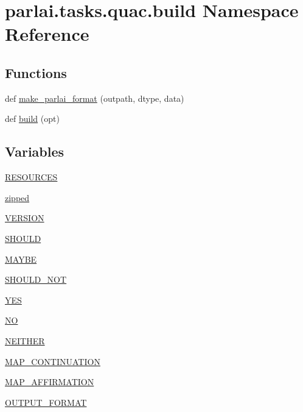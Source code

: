 \hypertarget{namespaceparlai_1_1tasks_1_1quac_1_1build}{}\section{parlai.\+tasks.\+quac.\+build Namespace Reference}
\label{namespaceparlai_1_1tasks_1_1quac_1_1build}
\subsection*{Functions}
\begin{DoxyCompactItemize}
\item 
def \hyperlink{namespaceparlai_1_1tasks_1_1quac_1_1build_a08c212462b5c58cde91192d35f24f0cc}{make\+\_\+parlai\+\_\+format} (outpath, dtype, data)
\item 
def \hyperlink{namespaceparlai_1_1tasks_1_1quac_1_1build_a86e9b7d4a167a4dc22e925770ce42824}{build} (opt)
\end{DoxyCompactItemize}
\subsection*{Variables}
\begin{DoxyCompactItemize}
\item 
\hyperlink{namespaceparlai_1_1tasks_1_1quac_1_1build_aa032453fdec498146aade28be1af2c6e}{R\+E\+S\+O\+U\+R\+C\+ES}
\item 
\hyperlink{namespaceparlai_1_1tasks_1_1quac_1_1build_a340e24695bb031dddd67c1782624c1ab}{zipped}
\item 
\hyperlink{namespaceparlai_1_1tasks_1_1quac_1_1build_aee2d9534e5051b42e514f35e83aa6750}{V\+E\+R\+S\+I\+ON}
\item 
\hyperlink{namespaceparlai_1_1tasks_1_1quac_1_1build_a4aacd61cba5c1f53ff8fcf6e13d83ec7}{S\+H\+O\+U\+LD}
\item 
\hyperlink{namespaceparlai_1_1tasks_1_1quac_1_1build_a65376ab86ca845a24c1c3aca39ffdf24}{M\+A\+Y\+BE}
\item 
\hyperlink{namespaceparlai_1_1tasks_1_1quac_1_1build_a0ebac26df68c69fd9163e1a61fa630ec}{S\+H\+O\+U\+L\+D\+\_\+\+N\+OT}
\item 
\hyperlink{namespaceparlai_1_1tasks_1_1quac_1_1build_a8187aab9baf4a32e341c7aac0f76ce14}{Y\+ES}
\item 
\hyperlink{namespaceparlai_1_1tasks_1_1quac_1_1build_a1f0a45f80454852cab90617333c286d1}{NO}
\item 
\hyperlink{namespaceparlai_1_1tasks_1_1quac_1_1build_a6f64e5967d769a9d8ad61771cfbd18a5}{N\+E\+I\+T\+H\+ER}
\item 
\hyperlink{namespaceparlai_1_1tasks_1_1quac_1_1build_ab5c463960c37a8cb5c2057aa7d15e537}{M\+A\+P\+\_\+\+C\+O\+N\+T\+I\+N\+U\+A\+T\+I\+ON}
\item 
\hyperlink{namespaceparlai_1_1tasks_1_1quac_1_1build_a65c0c865dad4567a45699d1069d1a923}{M\+A\+P\+\_\+\+A\+F\+F\+I\+R\+M\+A\+T\+I\+ON}
\item 
\hyperlink{namespaceparlai_1_1tasks_1_1quac_1_1build_a8f7034ce563ffc549210c71e6b26447a}{O\+U\+T\+P\+U\+T\+\_\+\+F\+O\+R\+M\+AT}
\end{DoxyCompactItemize}


